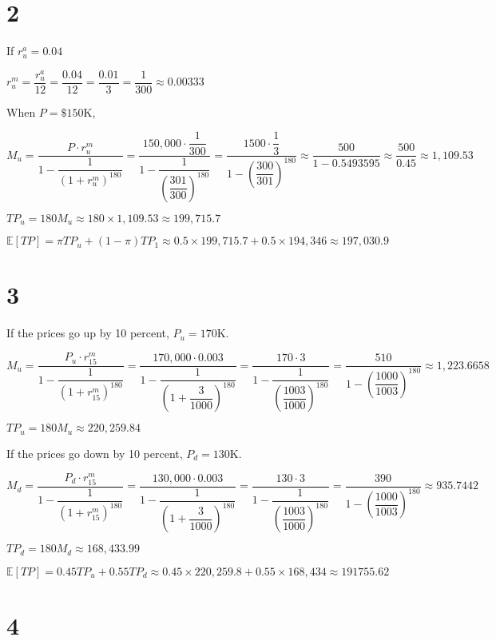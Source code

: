 \documentclass{article}
\begin{document}
\section*{2}

If $r^{a}_{u}=0.04$

$r^{m}_{u}=\dfrac{r^{a}_{u}}{12}=\dfrac{0.04}{12}=\dfrac{0.01}{3}=\dfrac{1}{300}\approx0.00333$

When $P=\$150$K,

$M_{u}=\dfrac{P\cdot r^{m}_{u}}{1-\dfrac{1}{\left(1+r^{m}_{u}\right)^{180}}}=\dfrac{150,000\cdot \dfrac{1}{300}}{1-\dfrac{1}{\left(\dfrac{301}{300}\right)^{180}}}=\dfrac{1500\cdot \dfrac{1}{3}}{1-\left(\dfrac{300}{301}\right)^{180}}\approx\dfrac{500}{1-0.5493595}\approx\dfrac{500}{0.45}\approx\boxed{1,109.53}$

$TP_{u}=180M_{u}\approx180\times1,109.53\approx199,715.7$

$\mathbb{E}\left[TP\right]=\pi TP_{u}+\left(1-\pi\right)TP_{1}\approx0.5\times199,715.7+0.5\times194,346\approx\boxed{197,030.9} $

\section*{3}

If the prices go up by 10 percent, $P_{u}=170$K.

$M_{u}=\dfrac{P_{u}\cdot r^{m}_{15}}{1-\dfrac{1}{\left(1+r^{m}_{15}\right)^{180}}}=\dfrac{170,000\cdot 0.003}{1-\dfrac{1}{\left(1+\dfrac{3}{1000}\right)^{180}}}=\dfrac{170\cdot 3}{1-\dfrac{1}{\left(\dfrac{1003}{1000}\right)^{180}}}=\dfrac{510}{1-\left(\dfrac{1000}{1003}\right)^{180}}\approx\boxed{1,223.6658}$

$TP_{u}=180M_{u}\approx\boxed{220,259.84}$

If the prices go down by 10 percent, $P_{d}=130$K.

$M_{d}=\dfrac{P_{d}\cdot r^{m}_{15}}{1-\dfrac{1}{\left(1+r^{m}_{15}\right)^{180}}}=\dfrac{130,000\cdot 0.003}{1-\dfrac{1}{\left(1+\dfrac{3}{1000}\right)^{180}}}=\dfrac{130\cdot 3}{1-\dfrac{1}{\left(\dfrac{1003}{1000}\right)^{180}}}=\dfrac{390}{1-\left(\dfrac{1000}{1003}\right)^{180}}\approx\boxed{935.7442}$

$TP_{d}=180M_{d}\approx\boxed{168,433.99}$

$\mathbb{E} \left[TP\right]=0.45TP_{u}+0.55TP_{d}\approx0.45\times220,259.8+0.55\times168,434\approx\boxed{191755.62}$

\section*{4}
\end{document}
